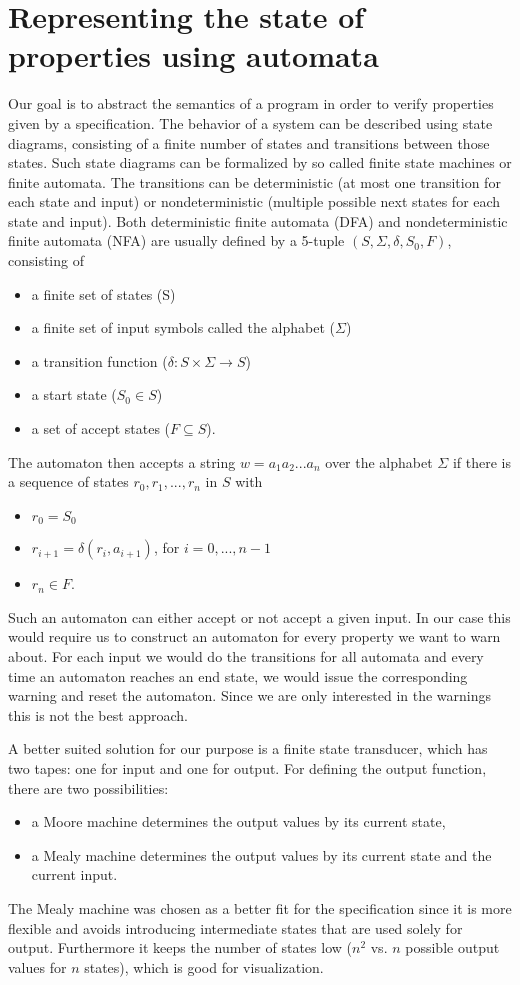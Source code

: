 \section{Representing the state of properties using automata}
Our goal is to abstract the semantics of a program in order to verify properties given by a specification.
The behavior of a system can be described using state diagrams, consisting of a finite number of states and transitions between those states.
Such state diagrams can be formalized by so called finite state machines or finite automata.
The transitions can be deterministic (at most one transition for each state and input) or nondeterministic (multiple possible next states for each state and input).
Both deterministic finite automata (DFA) and nondeterministic finite automata (NFA) are usually defined by a 5-tuple $(S, \Sigma, \delta, S_0, F)$, consisting of
\begin{itemize}
\item a finite set of states (S)
\item a finite set of input symbols called the alphabet ($\Sigma$)
\item a transition function ($\delta : S \times \Sigma \rightarrow S$)
\item a start state ($S_0 \in S$)
\item a set of accept states ($F \subseteq S$).
\end{itemize}
The automaton then accepts a string $w = a_1 a_2 ... a_n$ over the alphabet $\Sigma$ if there is a sequence of states $r_0, r_1, ..., r_n$ in $S$ with
\begin{itemize}
\item $r_0 = S_0$
\item $r_{i+1} = \delta(r_i, a_{i+1})$, for $i=0, ..., n-1$
\item $r_n \in F$.
\end{itemize}
Such an automaton can either accept or not accept a given input. In our case this would require us to construct an automaton for every property we want to warn about. For each input we would do the transitions for all automata and every time an automaton reaches an end state, we would issue the corresponding warning and reset the automaton. Since we are only interested in the warnings this is not the best approach.

A better suited solution for our purpose is a finite state transducer, which has two tapes: one for input and one for output. For defining the output function, there are two possibilities:
\begin{itemize}
\item a Moore machine determines the output values by its current state,
\item a Mealy machine determines the output values by its current state and the current input.
\end{itemize}
The Mealy machine was chosen as a better fit for the specification since it is more flexible and avoids introducing intermediate states that are used solely for output. Furthermore it keeps the number of states low ($n^2$ vs. $n$ possible output values for $n$ states), which is good for visualization.

